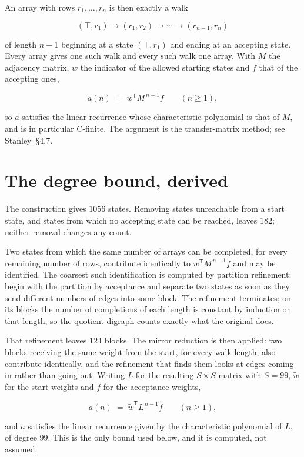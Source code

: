 \documentclass[11pt]{article}
\theoremstyle{definition}
\begin{document}
An array with rows $r_1,\dots,r_n$ is then exactly a walk

\[(\top,r_1) \to (r_1,r_2) \to \cdots \to (r_{n-1},r_n)\]

of length $n-1$ beginning at a state $(\top,r_1)$ and ending at an accepting state. Every array gives one such walk and every such walk one array. With $M$ the adjacency matrix, $w$ the indicator of the allowed starting states and $f$ that of the accepting ones,

\[a(n) \;=\; w^{\mathsf T} M^{\,n-1} f \qquad (n \ge 1),\]

so $a$ satisfies the linear recurrence whose characteristic polynomial is that of $M$, and is in particular C-finite. The argument is the transfer-matrix method; see Stanley~\S4.7.

\section{The degree bound, derived}

The construction gives $1056$ states. Removing states unreachable from a start state, and states from which no accepting state can be reached, leaves $182$; neither removal changes any count.

Two states from which the same number of arrays can be completed, for every remaining number of rows, contribute identically to $w^{\mathsf T}M^{\,n-1}f$ and may be identified. The coarsest such identification is computed by partition refinement: begin with the partition by acceptance and separate two states as soon as they send different numbers of edges into some block. The refinement terminates; on its blocks the number of completions of each length is constant by induction on that length, so the quotient digraph counts exactly what the original does.

That refinement leaves $124$ blocks. The mirror reduction is then applied: two blocks receiving the same weight from the start, for every walk length, also contribute identically, and the refinement that finds them looks at edges coming in rather than going out. Writing $L$ for the resulting $S \times S$ matrix with $S = 99$, $\tilde w$ for the start weights and $\tilde f$ for the acceptance weights,

\[a(n) \;=\; \tilde w^{\mathsf T} L^{\,n-1} \tilde f \qquad (n \ge 1),\]

and $a$ satisfies the linear recurrence given by the characteristic polynomial of $L$, of degree $99$. This is the only bound used below, and it is computed, not assumed.
\end{document}
